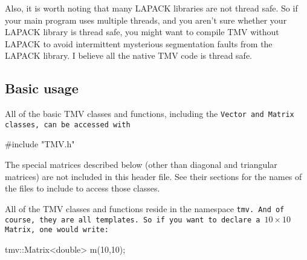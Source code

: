 \begin{enumerate}
Also, it is worth noting that many LAPACK libraries are not thread safe.
So if your main program uses multiple threads, and you aren't sure whether
your LAPACK library is thread safe, you might want to compile TMV without 
LAPACK to avoid intermittent mysterious segmentation faults from the
LAPACK library.  I believe all the native TMV code is thread safe.

\begin{comment}
\item
\textbf{Comments}

The code is highly commented, especially for the more complicated algorithms.
I have this egotistical quirk that I need to understand all of the code I write.
So none of the algorithms are just taken verbatim from LAPACK or anything like that.
I force myself to understand the algorithm (usually from Golub and van Loan,
but sometimes from a journal article or something I find on the net),
write a long comment explaining how it works, and then finally write the code
from scratch.  Then I usually compare my code to the LAPACK version, at which point
I have occasionally found ways to either speed it up or make it more accurate
(which also get commented, of course).

But the point is - if you want to understand how, say, the blocked Bunch-Kaufman
algorithm works, you'll probably do better looking at the comment in the 
TMV code than trying to decipher the LAPACK routines.  Plus, the code itself is
usually a lot more readable, since the arithmetic is written with the operator
overloads and such rather than the cryptic BLAS function names.
\end{comment}

\end{enumerate}

\subsection{Basic usage}

All of the basic TMV classes and functions, including the \tt{Vector} and \tt{Matrix} 
classes, can be accessed with
\begin{tmvcode}
#include "TMV.h"
\end{tmvcode}
The special matrices described below (other than diagonal and triangular matrices) 
are not included in this header file.
See their sections for the names
of the files to include to access those classes.

All of the TMV classes and functions reside in the namespace \tt{tmv}. 
And of course, they are all templates.
So if you want to declare a $10 \times 10$ \tt{Matrix}, one would write:
\begin{tmvcode}
tmv::Matrix<double> m(10,10);
\end{tmvcode}

